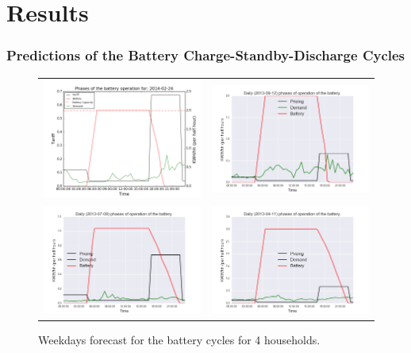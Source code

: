 \documentclass{beamer}
\begin{document}
\section{Results}
\begin{frame}
\frametitle{Predictions of the Battery Charge-Standby-Discharge Cycles}

\begin{figure}[htb]
\centering
 \begin{tabular}{@{}cc@{}}
   \includegraphics[width=.43\textwidth]{../img/fig3a.png} &
   \includegraphics[width=.43\textwidth]{../img/fig3b.png}   \\
   \includegraphics[width=.43\textwidth]{../img/fig3c.png} &
   \includegraphics[width=.43\textwidth]{../img/fig3d.png}
  \end{tabular}
  \caption{Weekdays forecast for the battery cycles for 4 households.}
\end{figure}

\end{frame}
\end{document}

